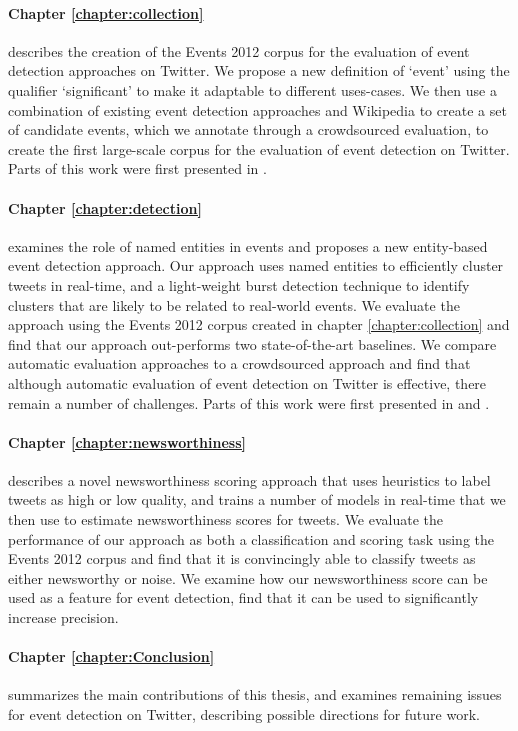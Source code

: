 \paragraph{Chapter \ref{chapter:collection}} describes the creation of the Events 2012 corpus for the evaluation of event detection approaches on Twitter. We propose a new definition of `event' using the qualifier `significant' to make it adaptable to different uses-cases.
We then use a combination of existing event detection approaches and Wikipedia to create a set of candidate events, which we annotate through a crowdsourced evaluation, to create the first large-scale corpus for the evaluation of event detection on Twitter. Parts of this work were first presented in \cite{McMinn2013}.

\paragraph{Chapter \ref{chapter:detection}} examines the role of named entities in events and proposes a new entity-based event detection approach.
Our approach uses named entities to efficiently cluster tweets in real-time, and a light-weight burst detection technique to identify clusters that are likely to be related to real-world events.
We evaluate the approach using the Events 2012 corpus created in chapter \ref{chapter:collection} and find that our approach out-performs two state-of-the-art baselines.
We compare automatic evaluation approaches to a crowdsourced approach and find that although automatic evaluation of event detection on Twitter is effective, there remain a number of challenges.
Parts of this work were first presented in \cite{McMinn14} and \cite{McMinn15}.

\paragraph{Chapter \ref{chapter:newsworthiness}} describes a novel newsworthiness scoring approach that uses heuristics to label tweets as high or low quality, and trains a number of models in real-time that we then use to estimate newsworthiness scores for tweets.
We evaluate the performance of our approach as both a classification and scoring task using the Events 2012 corpus and find that it is convincingly able to classify tweets as either newsworthy or noise.
We examine how our newsworthiness score can be used as a feature for event detection, find that it can be used to significantly increase precision.

\paragraph{Chapter \ref{chapter:Conclusion}} summarizes the main contributions of this thesis, and examines remaining issues for event detection on Twitter, describing possible directions for future work.


\newpage
